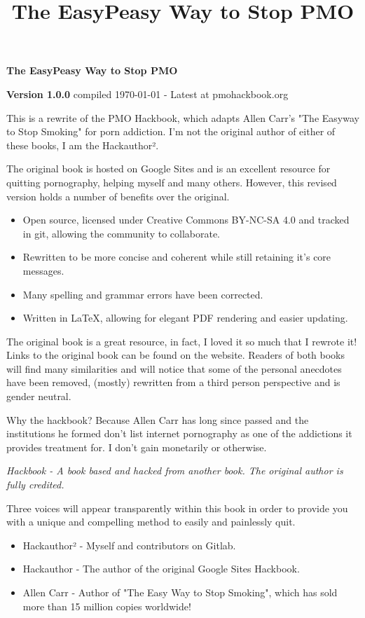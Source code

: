 \documentclass[easypeasy.tex]{subfiles}
\title {The EasyPeasy Way to Stop PMO}
\begin{document}
\thispagestyle{empty}

\begin{center}
  {\Huge\bfseries The EasyPeasy Way to Stop PMO \par}
  {\small \textbf{Version 1.0.0} compiled {\today} - Latest at pmohackbook.org}
\end{center}

This is a rewrite of the PMO Hackbook, which adapts Allen Carr's "The Easyway to Stop Smoking" for porn addiction. I'm not the original author of either of these books, I am the Hackauthor².

The original book is hosted on Google Sites and is an excellent resource for quitting pornography, helping myself and many others. However, this revised version holds a number of benefits over the original.
\begin{itemize}
\item Open source, licensed under Creative Commons BY-NC-SA 4.0 and tracked in git, allowing the community to collaborate.
\item Rewritten to be more concise and coherent while still retaining it's core messages.
\item Many spelling and grammar errors have been corrected.
\item Written in LaTeX, allowing for elegant PDF rendering and easier updating.
\end{itemize}

The original book is a great resource, in fact, I loved it so much that I rewrote it! Links to the original book can be found on the website. Readers of both books will find many similarities and will notice that some of the personal anecdotes have been removed, (mostly) rewritten from a third person perspective and is gender neutral.

Why the hackbook? Because Allen Carr has long since passed and the institutions he formed don't list internet pornography as one of the addictions it provides treatment for. I don't gain monetarily or otherwise.

\textit{{\small Hackbook - A book based and hacked from another book. The original author is fully credited.}}

Three voices will appear transparently within this book in order to provide you with a unique and compelling method to easily and painlessly quit.
\begin{itemize}
  \item Hackauthor² - Myself and contributors on Gitlab.
  \item Hackauthor - The author of the original Google Sites Hackbook.
  \item Allen Carr - Author of "The Easy Way to Stop Smoking", which has sold more than 15 million copies worldwide!
\end{itemize}
\end{document}
